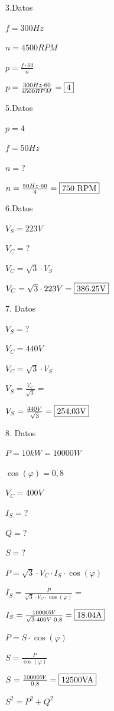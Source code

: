\documentclass[../main]{subfiles}
\begin{document}
\vspace{1cm}

3.Datos

$f=300Hz$

$n=4500RPM$

$p=\frac{f\cdot 60}{n}$

$p=\frac{300Hz\cdot 60}{4500RPM}=\fbox{4}$

\vspace{1cm}

5.Datos

$p=4$

$f=50Hz$

$n=$?

$n= \frac{50Hz\cdot 60}{4}=\fbox{750 RPM} $

\vspace{1cm}

6.Datos

$V_S=223V$

$V_C=$?

$V_C=\sqrt{3} \cdot V_S$

$V_C=\sqrt{3} \cdot 223V=\fbox{386.25V}$

\vspace{1cm}

7. Datos

$V_S=$?

$V_C=440V$

$V_C=\sqrt{3} \cdot V_S$

$V_S=\frac{V_C}{\sqrt{3}}=$

$V_S=\frac{440V}{\sqrt{3}}=\fbox{254.03V}$

\vspace{1cm}

8. Datos

$P=10kW=10000W$

$\cos(\varphi)=0,8$

$V_C=400V$

$I_S=$?

$Q=$?

$S=$?

$P=\sqrt{3}\cdot V_C \cdot I_S \cdot \cos(\varphi)$

$I_S=\frac{P}{\sqrt{3}\cdot V_C \cdot \cos(\varphi)}=$

$I_S=\frac{10000W}{\sqrt{3}\cdot 400V \cdot 0,8}= \fbox{18.04A}$

$P=S \cdot \cos(\varphi)$

$S=\frac{P} { \cos(\varphi)}$

$S=\frac{10000W} {0,8}=\fbox{12500VA}$

$S^2=P^2+Q^2$
\end{document}
